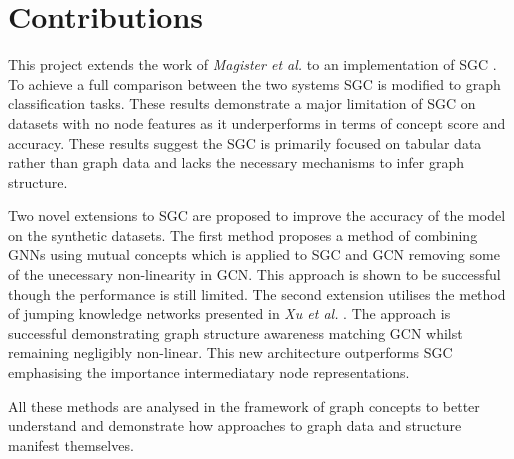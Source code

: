 
\section{Contributions}


This project extends the work of \textit{Magister et al.} \cite{magister2021gcexplainer} to an implementation of SGC \cite{wu2019simplifying}.
To achieve a full comparison between the two systems SGC is modified to graph classification tasks. 
These results demonstrate a major limitation of SGC on datasets with no node features as it underperforms in terms of concept score and accuracy.
These results suggest the SGC is primarily focused on tabular data rather than graph data and lacks the necessary mechanisms to infer graph structure.

Two novel extensions to SGC are proposed to improve the accuracy of the model on the synthetic datasets.
The first method proposes a method of combining GNNs using mutual concepts which is applied to SGC and GCN removing some of the unecessary non-linearity in GCN.
This approach is shown to be successful though the performance is still limited.
The second extension utilises the method of jumping knowledge networks presented in \textit{Xu et al.} \cite{xu2018representation}.
The approach is successful demonstrating graph structure awareness matching GCN whilst remaining negligibly non-linear.
This new architecture outperforms SGC emphasising the importance intermediatary node representations.

All these methods are analysed in the framework of graph concepts to better understand and demonstrate how approaches to graph data and structure manifest themselves.






